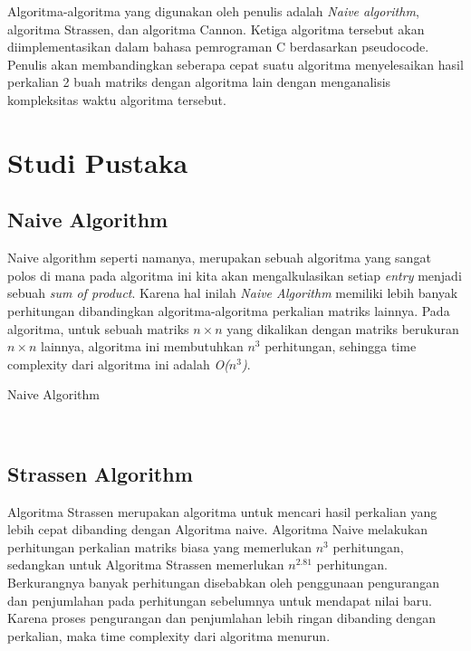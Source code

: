 \documentclass[conference]{IEEEtran}
\begin{document}
Algoritma-algoritma yang digunakan oleh penulis adalah \textit{Naive algorithm}, algoritma Strassen, dan algoritma Cannon.
Ketiga algoritma tersebut akan diimplementasikan dalam bahasa pemrograman C berdasarkan pseudocode.
Penulis akan membandingkan seberapa cepat suatu algoritma menyelesaikan hasil perkalian 2 buah matriks dengan algoritma lain dengan menganalisis kompleksitas waktu algoritma tersebut.

\section{Studi Pustaka}
\subsection{Naive Algorithm}
Naive algorithm seperti namanya, merupakan sebuah algoritma yang sangat polos di mana pada algoritma ini kita akan mengalkulasikan setiap \textit{entry} menjadi sebuah \textit{sum of product}. 
Karena hal inilah \textit{Naive Algorithm} memiliki lebih banyak perhitungan dibandingkan algoritma-algoritma perkalian matriks lainnya. 
Pada algoritma, untuk sebuah matriks $n\times n$ yang dikalikan dengan matriks berukuran $n\times n$ lainnya, algoritma ini membutuhkan $n^3$ perhitungan, 
sehingga time complexity dari algoritma ini adalah \textit{O($n^3$)}.

\begin{algorithm}
    \caption{Naive Algorithm}
    \\
\end{algorithm}


\subsection{Strassen Algorithm}
Algoritma Strassen merupakan algoritma untuk mencari hasil perkalian yang lebih cepat dibanding dengan Algoritma naive.
Algoritma Naive melakukan perhitungan perkalian matriks biasa yang memerlukan $n^3$ perhitungan, sedangkan untuk Algoritma Strassen memerlukan $n^{2.81}$ perhitungan. 
Berkurangnya banyak perhitungan disebabkan oleh penggunaan pengurangan dan penjumlahan pada perhitungan sebelumnya untuk mendapat nilai baru.
Karena proses pengurangan dan penjumlahan lebih ringan dibanding dengan perkalian, maka time complexity dari algoritma menurun.
\end{document}
